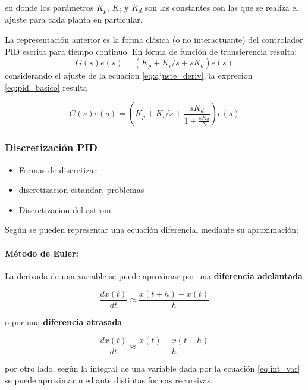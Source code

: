 \documentclass[10pt,conference,a4paper,onecolumn]{article}%
\begin{document}
en donde los parámetros $K_p$, $K_i$ y $K_d$ son las constantes con las que se realiza el ajuste para cada planta en particular. 

La representación anterior es la forma clásica (o no interactuante) del controlador PID escrita para tiempo continuo. En forma de función de transferencia resulta:
\begin{equation}
G(s)e(s)=(K_p + K_i/s + sK_d)e(s)
\label{eq:pid_basico}
\end{equation}
considerando el ajuste de la ecuacion \ref{eq:ajuste_deriv}, la exprecion \ref{eq:pid_basico} resulta

\begin{equation}
G(s)e(s)=\left( K_p + K_i/s + \frac{sK_d}{1+\frac{sK_d}{N} } \right)e(s)
\label{eq:pid_final}
\end{equation}



 
 \subsubsection{Discretización PID}
 \begin{itemize}
 \item Formas de discretizar
 \item discretizacion estandar, problemas
 \item Discretizacion del astrom
 \end{itemize}
 
 Según \cite[pág. 214]{astrom} se pueden representar una ecuación diferencial mediante su aproximación:
 
 \paragraph{Método de Euler:} La derivada de una variable se puede aproximar por una \textbf{diferencia adelantada}
 
 \begin{equation}
 \frac{dx(t)}{dt}\approx \frac{x(t+h)-x(t)}{h}
 \end{equation}
  
  o por  una \textbf{diferencia atrasada}
  
   \begin{equation}
 \frac{dx(t)}{dt}\approx \frac{x(t)-x(t-h)}{h}
 \end{equation}
  
  por otro lado, según \cite[pág. 46 ]{biblia_PID} la integral de una variable dada por la ecuación \ref{eq:int_var} se puede aproximar mediante  distintas formas recursivas.
  
\end{document}
